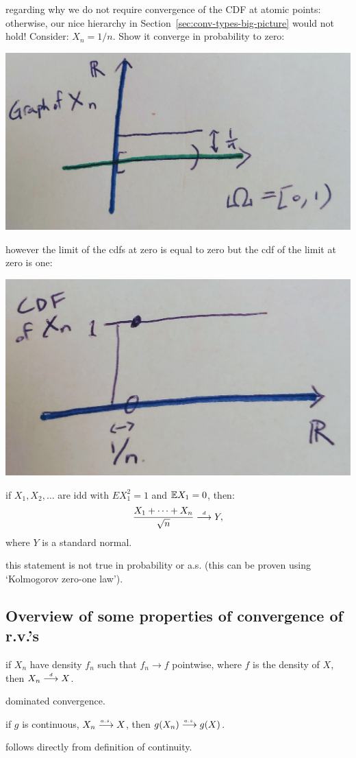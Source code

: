\documentclass{article}
\begin{document}
 regarding why we do not require convergence of the CDF at atomic points: otherwise, our nice hierarchy in Section~\ref{sec:conv-types-big-picture} would not hold! Consider: $X_n = 1/n$. Show it converge in probability to zero:
\begin{center}
	\includegraphics[width=0.5\linewidth]{figures/conv-dist-counter} 
\end{center}
however the limit of the cdfs at zero is equal to zero but the cdf of the limit at zero is one:
\begin{center}
	\includegraphics[width=0.5\linewidth]{figures/conv-dist-counter-2} 
\end{center}

 if $X_1, X_2, \dots$ are idd with $E X_1^2 = 1$ and ${\mathbb E} X_1 = 0$, then:
\[ \frac{X_1 + \dots + X_n}{\sqrt{n}} \stackrel{\scriptscriptstyle d}{\longrightarrow} Y, \]
where $Y$ is a standard normal. 

 this statement is not true in probability or a.s. (this can be proven using `Kolmogorov zero-one law').


\subsection{Overview of some properties of convergence of r.v.'s}

 if $X_n$ have density $f_n$ such that $f_n \to f$ pointwise, where $f$ is the density of $X$, then $X_n \stackrel{\scriptscriptstyle d}{\longrightarrow} X$.

 dominated convergence.

  if $g$ is continuous, $X_n \stackrel{\scriptscriptstyle a.s.}{\longrightarrow} X$, then $g(X_n) \stackrel{\scriptscriptstyle a.s.}{\longrightarrow} g(X)$. 

 follows directly from definition of continuity.
\end{document}
